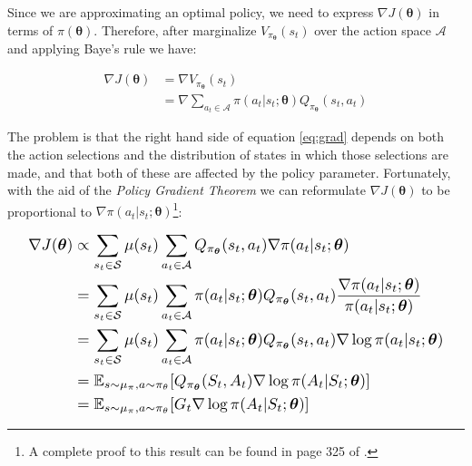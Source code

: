 \documentclass[twoside,twocolumn]{article}
\begin{document}
Since we are approximating an optimal policy, we need to express $\nabla J(\boldsymbol{\theta})$ in terms of $\pi(\boldsymbol{\theta})$. Therefore, after marginalize $V_{\pi_{\boldsymbol{\theta}}}(s_t)$ over the action space $\mathcal{A}$ and applying Baye's rule we have:

\begin{equation}
  \begin{split}
    \nabla J({\boldsymbol{\theta}}) &= \nabla V_{\pi_{\boldsymbol{\theta}}}(s_t)\\
    &= \nabla \sum_{a_t \in \mathcal{A}} \pi (a_t|s_t; \boldsymbol{\theta}) Q_{\pi_{\boldsymbol{\theta}}}(s_t,a_t)
  \end{split}
  \label{eq:grad}
\end{equation}

The problem is that the right hand side of equation \ref{eq:grad} depends on both the action selections and the distribution of states in which those selections are made, and that both of these are affected by the policy parameter. Fortunately, with the aid of the \emph{Policy Gradient Theorem} we can reformulate $\nabla J({\boldsymbol{\theta}})$ to be proportional to $\nabla \pi (a_t|s_t; \boldsymbol{\theta})$\footnote{A complete proof to this result can be found in page 325 of \cite{Sutton1998}.}:

\begin{equation*}
\resizebox{.95\linewidth}{!}{%
  $\begin{split}
    \nabla J({\boldsymbol{\theta}}) &\propto
    \sum_{s_t \in \mathcal{S}} \mu (s_t) \sum_{a_t \in \mathcal{A}} Q_{\pi_{\boldsymbol{\theta}}}(s_t,a_t) \nabla \pi (a_t|s_t; \boldsymbol{\theta}) \\
    &=\sum_{s_t \in \mathcal{S}} \mu (s_t) \sum_{a_t \in \mathcal{A}} \pi (a_t|s_t; \boldsymbol{\theta}) Q_{\pi_{\boldsymbol{\theta}}}(s_t,a_t) \frac{\nabla \pi (a_t|s_t; \boldsymbol{\theta})}{\pi (a_t|s_t; \boldsymbol{\theta})} \\
    &=\sum_{s_t \in \mathcal{S}} \mu (s_t) \sum_{a_t \in \mathcal{A}} \pi (a_t|s_t; \boldsymbol{\theta}) Q_{\pi_{\boldsymbol{\theta}}}(s_t,a_t) \nabla \log{\pi (a_t|s_t; \boldsymbol{\theta})} \\
    &= \mathbb{E}_{s \sim \mu_{\pi}, a \sim \pi_{\theta}}[Q_{\pi_{\boldsymbol{\theta}}}(S_t,A_t) \nabla \log{\pi (A_t|S_t; \boldsymbol{\theta})}] \\
    &= \mathbb{E}_{s \sim \mu_{\pi}, a \sim \pi_{\theta}}[G_t \nabla \log{\pi (A_t|S_t; \boldsymbol{\theta})}] \\
  \end{split}
  $}
\end{equation*}
\end{document}
